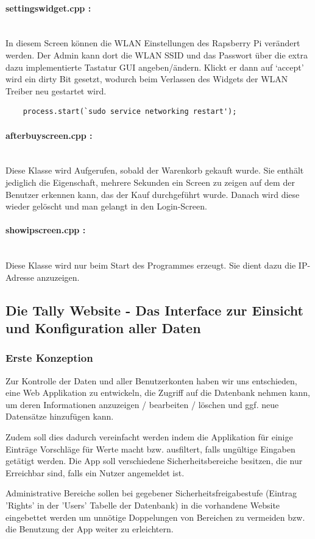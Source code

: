 \documentclass[11pt,a4paper]{article} %
\begin{document}
\paragraph{settingswidget.cpp :} $\;$ \\
	In diesem Screen können die WLAN Einstellungen des Rapsberry Pi verändert werden. Der Admin kann dort die WLAN SSID und das Passwort über die extra dazu implementierte Tastatur GUI angeben/ändern.
	Klickt er dann auf `accept' wird ein dirty Bit gesetzt, wodurch beim Verlassen des Widgets der WLAN Treiber neu gestartet wird. 
	\begin{frame}

\begin{lstlisting}
	process.start(`sudo service networking restart');
	\end{lstlisting}
\end{frame}
\par	
\paragraph{afterbuyscreen.cpp :} $\;$ \\
	Diese Klasse wird Aufgerufen, sobald der Warenkorb gekauft wurde. Sie enthält jediglich die Eigenschaft, mehrere Sekunden ein Screen zu zeigen auf dem der Benutzer erkennen kann, das der Kauf durchgeführt wurde.
	Danach wird diese wieder gelöscht und man gelangt in den Login-Screen.

\paragraph{showipscreen.cpp :} $\;$ \\
		Diese Klasse wird nur beim Start des Programmes erzeugt. Sie dient dazu die IP-Adresse anzuzeigen.
		

\subsection{Die Tally Website - Das Interface zur Einsicht und Konfiguration aller Daten}


\subsubsection{Erste Konzeption}

Zur  Kontrolle der Daten und aller Benutzerkonten haben wir uns entschieden, eine Web Applikation zu entwickeln, die Zugriff auf die Datenbank nehmen kann, um deren Informationen anzuzeigen / bearbeiten / löschen und ggf. neue Datensätze hinzufügen kann. 
\par
Zudem soll dies dadurch vereinfacht werden indem die Applikation für einige Einträge Vorschläge für Werte macht bzw. ausfiltert, falls ungültige Eingaben getätigt werden. Die App soll verschiedene Sicherheitsbereiche besitzen, die nur Erreichbar sind, falls ein Nutzer angemeldet ist. 
\par
Administrative Bereiche sollen bei gegebener Sicherheitsfreigabestufe (Eintrag  'Rights' in der 'Users' Tabelle der Datenbank) in die vorhandene Website eingebettet werden um unnötige Doppelungen von Bereichen zu vermeiden bzw. die Benutzung der App weiter zu erleichtern.
\end{document}
